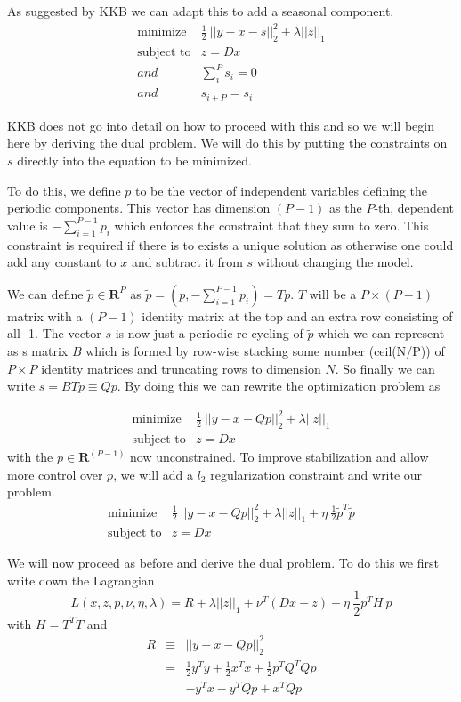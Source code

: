 \documentclass{article}
\begin{document}
As suggested by KKB we can adapt this to add a seasonal component.
\begin{eqnarray}
\mbox{minimize} & \frac{1}{2} ~ || y - x -s||_2^2  + \lambda ||z||_1 \\
\mbox{subject to} & z = D x \\
and & \sum_i^P s_i = 0\\
and & s_{i+P} = s_i
\end{eqnarray}

KKB does not go into detail on how to proceed with this and so we will begin here by deriving
the dual problem. We will do this by putting the constraints on $s$ directly into the
equation to be minimized.

To do this, we define $p$ to be the vector of independent variables defining the periodic components.
This vector has dimension $(P-1)$ as the $P$-th, dependent value is $-\sum_{i=1}^{P-1} p_i$ which enforces the constraint that
they sum to zero. This constraint is required if there is to exists a unique solution as otherwise one could add
any constant to $x$ and subtract it from $s$ without changing the model.

We can define $\tilde{p} \in \mathbf{R}^{P}$ as $\tilde{p} = \left( p,-\sum_{i=1}^{P-1} p_i \right) = T p$.
$T$ will be a $P \times (P-1)$ matrix with a $(P-1)$ identity matrix at the top and an extra row consisting of all -1.
The vector $s$ is now just a periodic re-cycling of $\tilde{p}$ which we can represent as s matrix $B$ which is formed by
row-wise stacking some number (ceil(N/P)) of $P \times P$ identity matrices and truncating rows to dimension $N$. So finally
we can write $s = B T p \equiv Q p$. By doing this we can rewrite the optimization problem as

\begin{eqnarray}
\mbox{minimize} & \frac{1}{2} ~ || y - x - Q p||_2^2  + \lambda ||z||_1 \\
\mbox{subject to} & z = D x
\end{eqnarray}
with the $p \in \mathbf{R}^{(P-1)}$ now unconstrained. To improve stabilization and allow more control over $p$, we will add
a $l_2$ regularization constraint and write our problem.
\begin{eqnarray}
\mbox{minimize} & \frac{1}{2} ~ || y - x - Q p||_2^2  + \lambda ||z||_1 + \eta ~ \frac{1}{2} \tilde{p}^T \tilde{p}\\
\mbox{subject to} & z = D x
\end{eqnarray}

We will now proceed as before and derive the dual problem. To do this we first
write down the Lagrangian
\[
L(x,z,p,\nu,\eta,\lambda) =  R  + \lambda ||z||_1 + \nu^T (D x -z) + \eta ~ \frac{1}{2} p^T H ~p
\]
with  $H = T^T T$ and
\begin{eqnarray}
R & \equiv & || y - x - Q p||_2^2 \\
& = & \frac{1}{2} y^T y + \frac{1}{2} x^T x + \frac{1}{2} p^T Q^T Q p \\
&  & - y^T x - y^T Q p + x^T Q p
\end{eqnarray}
\end{document}

